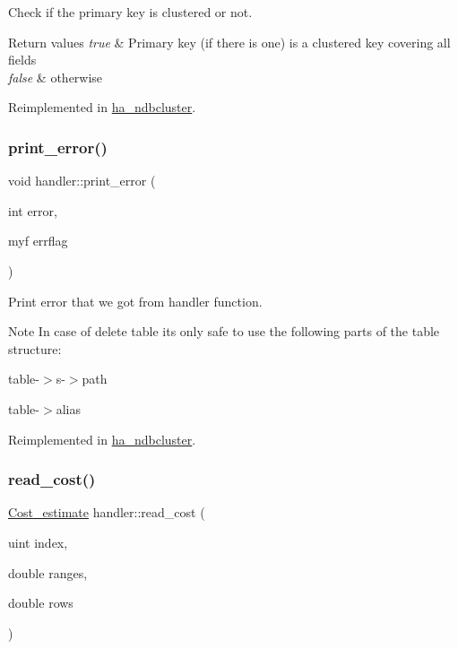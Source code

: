 Check if the primary key is clustered or not.


\begin{DoxyRetVals}{Return values}
{\em true} & Primary key (if there is one) is a clustered key covering all fields \\
\hline
{\em false} & otherwise \\
\hline
\end{DoxyRetVals}


Reimplemented in \mbox{\hyperlink{classha__ndbcluster_abf1a2f928fcc952bbe31d8c496ef0dce}{ha\+\_\+ndbcluster}}.

\mbox{\label{classhandler_afda4f1390385a4dc0bfd2981fee23e6c}} 
\subsubsection{\texorpdfstring{print\+\_\+error()}{print\_error()}}
{\footnotesize\ttfamily void handler\+::print\+\_\+error (\begin{DoxyParamCaption}\item[{int}]{error,  }\item[{myf}]{errflag }\end{DoxyParamCaption})\hspace{0.3cm}{\ttfamily [virtual]}}

Print error that we got from handler function.

\begin{DoxyNote}{Note}
In case of delete table it\textquotesingle{}s only safe to use the following parts of the \textquotesingle{}table\textquotesingle{} structure\+:
\begin{DoxyItemize}
\item table-\/$>$s-\/$>$path
\item table-\/$>$alias 
\end{DoxyItemize}
\end{DoxyNote}


Reimplemented in \mbox{\hyperlink{classha__ndbcluster_ab4b4b9ed3726be8a4a0887785a5ed530}{ha\+\_\+ndbcluster}}.

\mbox{\label{classhandler_a196d85fe55a71cc09c642592e771b662}} 
\subsubsection{\texorpdfstring{read\+\_\+cost()}{read\_cost()}}
{\footnotesize\ttfamily \mbox{\hyperlink{classCost__estimate}{Cost\+\_\+estimate}} handler\+::read\+\_\+cost (\begin{DoxyParamCaption}\item[{uint}]{index,  }\item[{double}]{ranges,  }\item[{double}]{rows }\end{DoxyParamCaption})\hspace{0.3cm}{\ttfamily [virtual]}}

